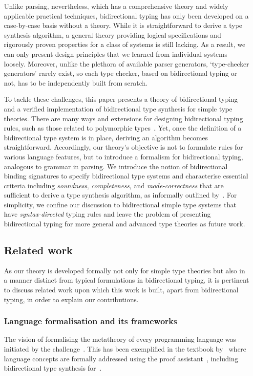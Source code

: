 Unlike parsing, nevertheless, which has a comprehensive theory and widely applicable practical techniques, bidirectional typing has only been developed on a case-by-case basis without a theory.
While it is straightforward to derive a type synthesis algorithm, a general theory providing logical specifications and rigorously proven properties for a class of systems is still lacking.
As a result, we can only present design principles that we learned from individual systems loosely.
Moreover, unlike the plethora of available parser generators, `type-checker generators' rarely exist, so each type checker, based on bidirectional typing or not, has to be independently built from scratch.

To tackle these challenges, this paper presents a theory of bidirectional typing and a verified implementation of bidirectional type synthesis for simple type theories.
There are many ways and extensions for designing bidirectional typing rules, such as those related to polymorphic types~\citep{Pierce2000,Peyton-Jones2007,Dunfield2013,Xie2018}.
Yet, once the definition of a bidirectional type system is in place, deriving an algorithm becomes straightforward.
Accordingly, our theory's objective is not to formulate rules for various language features, but to introduce a formalism for bidirectional typing, analogous to grammar in parsing.
We introduce the notion of bidirectional binding signatures to specify bidirectional type systems and characterise essential criteria including \emph{soundness}, \emph{completeness}, and \emph{mode-correctness} that are sufficient to derive a type synthesis algorithm, as informally outlined by~\citet{Dunfield2021}.
For simplicity, we confine our discussion to bidirectional simple type systems that have \emph{syntax-directed} typing rules and leave the problem of presenting bidirectional typing for more general and advanced type theories as future work.

\subsection{Related work}\label{sec:related-work}
As our theory is developed formally not only for simple type theories but also in a manner distinct from typical formulations in bidirectional typing, it is pertinent to discuss related work upon which this work is built, apart from bidirectional typing, in order to explain our contributions.

\subsubsection{Language formalisation and its frameworks} \label{sec:language-formalisation}
The vision of formalising the metatheory of every programming language was initiated by the \PoplMark challenge~\citep{Aydemir2005}.
This has been exemplified in the textbook by~\citet{Wadler2022} where language concepts are formally addressed using the proof assistant~\Agda, including bidirectional type synthesis for~\PCF.

